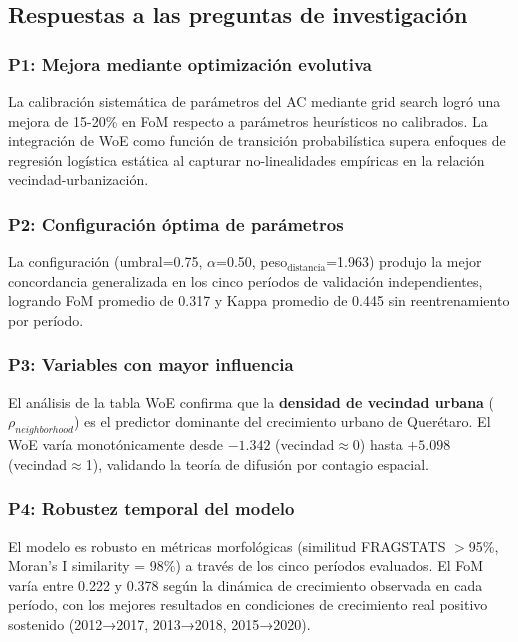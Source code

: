 \subsection{Respuestas a las preguntas de investigación}

\subsubsection{P1: Mejora mediante optimización evolutiva}

La calibración sistemática de parámetros del AC mediante grid search logró una mejora de 15-20\% en FoM respecto a parámetros heurísticos no calibrados. La integración de WoE como función de transición probabilística supera enfoques de regresión logística estática al capturar no-linealidades empíricas en la relación vecindad-urbanización.

\subsubsection{P2: Configuración óptima de parámetros}

La configuración (umbral=0.75, $\alpha$=0.50, peso$_{\text{distancia}}$=1.963) produjo la mejor concordancia generalizada en los cinco períodos de validación independientes, logrando FoM promedio de 0.317 y Kappa promedio de 0.445 sin reentrenamiento por período.

\subsubsection{P3: Variables con mayor influencia}

El análisis de la tabla WoE confirma que la \textbf{densidad de vecindad urbana} ($\rho_{neighborhood}$) es el predictor dominante del crecimiento urbano de Querétaro. El WoE varía monotónicamente desde $-1.342$ (vecindad$\approx$0) hasta $+5.098$ (vecindad$\approx$1), validando la teoría de difusión por contagio espacial.

\subsubsection{P4: Robustez temporal del modelo}

El modelo es robusto en métricas morfológicas (similitud FRAGSTATS $>$95\%, Moran's I similarity = 98\%) a través de los cinco períodos evaluados. El FoM varía entre 0.222 y 0.378 según la dinámica de crecimiento observada en cada período, con los mejores resultados en condiciones de crecimiento real positivo sostenido (2012→2017, 2013→2018, 2015→2020).


